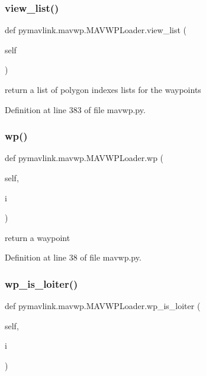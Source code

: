 \subsubsection{\texorpdfstring{view\_list()}{view\_list()}}
{\footnotesize\ttfamily def pymavlink.\+mavwp.\+M\+A\+V\+W\+P\+Loader.\+view\+\_\+list (\begin{DoxyParamCaption}\item[{}]{self }\end{DoxyParamCaption})}

\begin{DoxyVerb}return a list of polygon indexes lists for the waypoints\end{DoxyVerb}
 

Definition at line 383 of file mavwp.\+py.

\mbox{\label{classpymavlink_1_1mavwp_1_1MAVWPLoader_a30cdf4df3d3797823d0137848800a204}} 
\subsubsection{\texorpdfstring{wp()}{wp()}}
{\footnotesize\ttfamily def pymavlink.\+mavwp.\+M\+A\+V\+W\+P\+Loader.\+wp (\begin{DoxyParamCaption}\item[{}]{self,  }\item[{}]{i }\end{DoxyParamCaption})}

\begin{DoxyVerb}return a waypoint\end{DoxyVerb}
 

Definition at line 38 of file mavwp.\+py.

\mbox{\label{classpymavlink_1_1mavwp_1_1MAVWPLoader_a286be0ad910cb10799ddb7f16a04fb10}} 
\subsubsection{\texorpdfstring{wp\_is\_loiter()}{wp\_is\_loiter()}}
{\footnotesize\ttfamily def pymavlink.\+mavwp.\+M\+A\+V\+W\+P\+Loader.\+wp\+\_\+is\+\_\+loiter (\begin{DoxyParamCaption}\item[{}]{self,  }\item[{}]{i }\end{DoxyParamCaption})}

